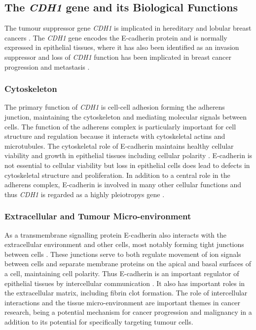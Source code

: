 \subsection{The \textit{CDH1} gene and its Biological Functions}
The \gls{tumour suppressor} gene \textit{CDH1} is implicated in \gls{hereditary} and  lobular breast cancers \citep{Berx1996,DeLeeuw1997,Berx2009,Vos1997,Semb1998,Masciari2007}. The \textit{CDH1} gene encodes the \gls{E-cadherin} protein and is normally expressed in epithelial tissues, where it has also been identified as an invasion suppressor and loss of \textit{CDH1} function has been implicated in breast cancer progression and metastasis \citep{Berx1995,Becker1994,Christofori1999}.

\subsubsection{Cytoskeleton}
The primary function of \textit{CDH1} is cell-cell adhesion forming the adherens junction, maintaining the cytoskeleton and mediating molecular signals between cells. The function of the adherens complex is particularly important for cell structure and regulation because it interacts with cytoskeletal actins and microtubules. The cytoskeletal role of \gls{E-cadherin} maintains healthy cellular viability and growth in epithelial tissues including cellular polarity \citep{Jeanes2008}. \gls{E-cadherin} is not \gls{essential} to cellular viability but loss in epithelial cells does lead to defects in cytoskeletal structure and proliferation. In addition to a central role in the adherens complex, \gls{E-cadherin} is involved in many other cellular functions and thus \textit{CDH1} is regarded as a highly \glspl{pleiotropy} gene \citep{Kroepil2012}.

\subsubsection{Extracellular and Tumour Micro-environment}
As a transmembrane signalling protein \gls{E-cadherin} also interacts with the extracellular environment and other cells, most notably forming tight junctions between cells \citep{Chen2014, Tunggal2005}. These junctions serve to both regulate movement of ion signals between cells and separate membrane proteins on the apical and basal surfaces of a cell, maintaining cell polarity. Thus \gls{E-cadherin} is an important regulator of epithelial tissues by intercellular communication \citep{Jeanes2008}. It also has important roles in the extracellular matrix, including fibrin clot formation. The role of intercellular interactions and the tissue micro-environment are important themes in cancer research, being a potential mechanism for cancer progression and malignancy in a addition to its potential for specifically targeting tumour cells.

